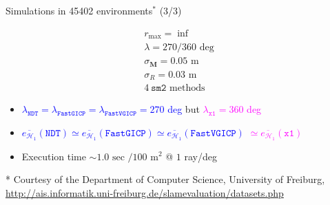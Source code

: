 \begin{frame}[noframenumbering]{Simulations in 45402 environments$^*$ (3/3)}

    \begin{minipage}{0.25\textwidth}
      \begin{bw_box}
      \begin{align}
        r_{\max} = \inf \nonumber \\
        \lambda = 270 / 360 \text{ deg} \nonumber \\
        \sigma_{\bm{M}} = 0.05 \text{ m} \nonumber \\
        \sigma_R = 0.03 \text{ m} \nonumber \\
        4 \ \texttt{sm2} \text{ methods} \nonumber
      \end{align}
      \end{bw_box}
    \end{minipage}%
    \hspace{0.03cm}\begin{minipage}{.74\textwidth}
      \begin{bw_box}
        \begin{itemize}\small
          \item \textcolor{blue}{$\lambda_{\texttt{NDT}} = \lambda_{\texttt{FastGICP}} = \lambda_{\texttt{FastVGICP}} = 270$ deg} but \textcolor{magenta}{$\lambda_{\texttt{x1}} = 360$ deg}
          \item \textcolor{blue}{$\overline{e_{\mathcal{H}_1}}(\texttt{NDT}) \simeq \overline{e_{\mathcal{H}_1}}(\texttt{FastGICP}) \simeq \overline{e_{\mathcal{H}_1}}(\texttt{FastVGICP})$} \textcolor{magenta}{$\simeq \overline{e_{\mathcal{H}_1}}(\texttt{x1})$}
        \item Execution time $\sim 1.0 \text{ sec } / 100$ m$^2$ @ $1$ ray/deg
      \end{itemize}
      \end{bw_box}
    \end{minipage}

  \placebottom \vspace{-1.0cm} \tiny {* Courtesy of the Department of Computer Science, University of Freiburg, \url{http://ais.informatik.uni-freiburg.de/slamevaluation/datasets.php}}

\end{frame}
